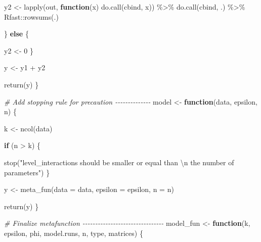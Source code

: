 \documentclass[
  11pt,
]{article}
\newenvironment{Shaded}{\begin{snugshade}}{\end{snugshade}}
\newcommand{\AttributeTok}[1]{\textcolor[rgb]{0.77,0.63,0.00}{#1}}
\newcommand{\CommentTok}[1]{\textcolor[rgb]{0.56,0.35,0.01}{\textit{#1}}}
\newcommand{\ControlFlowTok}[1]{\textcolor[rgb]{0.13,0.29,0.53}{\textbf{#1}}}
\newcommand{\DecValTok}[1]{\textcolor[rgb]{0.00,0.00,0.81}{#1}}
\newcommand{\FunctionTok}[1]{\textcolor[rgb]{0.00,0.00,0.00}{#1}}
\newcommand{\NormalTok}[1]{#1}
\newcommand{\OtherTok}[1]{\textcolor[rgb]{0.56,0.35,0.01}{#1}}
\newcommand{\SpecialCharTok}[1]{\textcolor[rgb]{0.00,0.00,0.00}{#1}}
\newcommand{\StringTok}[1]{\textcolor[rgb]{0.31,0.60,0.02}{#1}}
\begin{document}
\begin{Shaded}
\begin{Highlighting}[]
\NormalTok{    y2 }\OtherTok{\textless{}{-}} \FunctionTok{lapply}\NormalTok{(out, }\ControlFlowTok{function}\NormalTok{(x) }\FunctionTok{do.call}\NormalTok{(cbind, x)) }\SpecialCharTok{\%\textgreater{}\%}
      \FunctionTok{do.call}\NormalTok{(cbind, .) }\SpecialCharTok{\%\textgreater{}\%}
\NormalTok{      Rfast}\SpecialCharTok{::}\FunctionTok{rowsums}\NormalTok{(.)}

\NormalTok{  \} }\ControlFlowTok{else}\NormalTok{ \{}

\NormalTok{    y2 }\OtherTok{\textless{}{-}} \DecValTok{0}
\NormalTok{  \}}

\NormalTok{  y }\OtherTok{\textless{}{-}}\NormalTok{ y1 }\SpecialCharTok{+}\NormalTok{ y2}

  \FunctionTok{return}\NormalTok{(y)}
\NormalTok{\}}

\CommentTok{\# Add stopping rule for precaution {-}{-}{-}{-}{-}{-}{-}{-}{-}{-}{-}{-}{-}{-}}
\NormalTok{model }\OtherTok{\textless{}{-}} \ControlFlowTok{function}\NormalTok{(data, epsilon, n) \{}

\NormalTok{  k }\OtherTok{\textless{}{-}} \FunctionTok{ncol}\NormalTok{(data)}

  \ControlFlowTok{if}\NormalTok{ (n }\SpecialCharTok{\textgreater{}}\NormalTok{ k) \{}

    \FunctionTok{stop}\NormalTok{(}\StringTok{"level\_interactions should be smaller or equal than }\SpecialCharTok{\textbackslash{}n}
\StringTok{         the number of parameters"}\NormalTok{)}
\NormalTok{  \}}

\NormalTok{  y }\OtherTok{\textless{}{-}} \FunctionTok{meta\_fun}\NormalTok{(}\AttributeTok{data =}\NormalTok{ data, }\AttributeTok{epsilon =}\NormalTok{ epsilon, }\AttributeTok{n =}\NormalTok{ n)}

  \FunctionTok{return}\NormalTok{(y)}
\NormalTok{\}}

\CommentTok{\# Finalize metafunction {-}{-}{-}{-}{-}{-}{-}{-}{-}{-}{-}{-}{-}{-}{-}{-}{-}{-}{-}{-}{-}{-}{-}{-}{-}{-}{-}{-}{-}{-}{-}{-}}
\NormalTok{model\_fun }\OtherTok{\textless{}{-}} \ControlFlowTok{function}\NormalTok{(k, epsilon, phi, model.runs, n, type, matrices) \{}


\end{Highlighting}
\end{Shaded}
\end{document}
